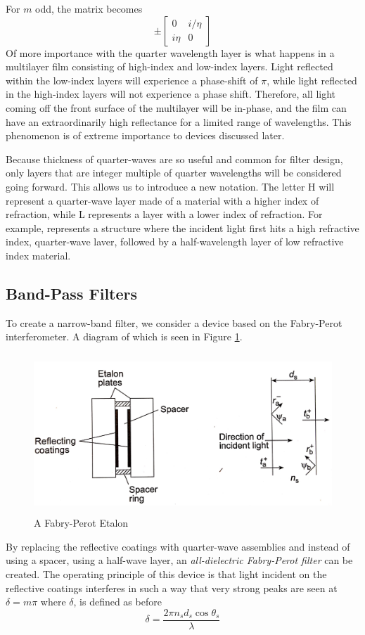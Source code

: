\documentclass{article}
\begin{document}
    For $m$ odd, the matrix becomes
    \begin{equation*}
        \pm
        \begin{bmatrix}
            0 & i/\eta \\
            i \eta & 0
        \end{bmatrix}
    \end{equation*}
    Of more importance with the quarter wavelength layer is what happens in a multilayer film consisting of high-index and low-index layers. Light reflected within the low-index layers will experience a phase-shift of $\pi$, while light reflected in the high-index layers will not experience a phase shift. Therefore, all light coming off the front surface of the multilayer will be in-phase, and the film can have an extraordinarily high reflectance for a limited range of wavelengths. This phenomenon is of extreme importance to devices discussed later.

    Because thickness of quarter-waves are so useful and common for filter design, only layers that are integer multiple of quarter wavelengths will be considered going forward. This allows us to introduce a new notation. The letter H will represent a quarter-wave layer made of a material with a higher index of refraction, while L represents a layer with a lower index of refraction. For example,  represents a structure where the incident light first hits a high refractive index, quarter-wave laver, followed by a half-wavelength layer of low refractive index material.

\subsection{Band-Pass Filters}
    To create a narrow-band filter, we consider a device based on the Fabry-Perot interferometer. A diagram of which is seen in Figure \ref{fig:etalon}.
    \begin{figure}
        \includegraphics[height=6cm]{etalon.png}
        \caption{A Fabry-Perot Etalon}
        \label{fig:etalon}        
    \end{figure}
    By replacing the reflective coatings with quarter-wave assemblies and instead of using a spacer, using a half-wave layer, an \emph{all-dielectric Fabry-Perot filter} can be created. The operating principle of this device is that light incident on the reflective coatings interferes in such a way that very strong peaks are seen at $\delta = m \pi$ where $\delta$, is defined as before $$ \delta = \frac{2 \pi n_s d_s \cos \theta_s}{\lambda} $$
\end{document}
